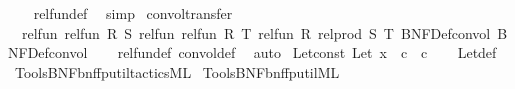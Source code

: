 \begin{isabellebody}
%
\isadelimproof
\ \ %
\endisadelimproof
%
\isatagproof
{}\isamarkupfalse%
\ rel{\isacharunderscore}{\kern0pt}fun{\isacharunderscore}{\kern0pt}def\ \isamarkupfalse%
\ simp%
\endisatagproof
{\isafoldproof}%
%
\isadelimproof
\isanewline
%
\endisadelimproof
\isanewline
{}\isamarkupfalse%
\ convol{\isacharunderscore}{\kern0pt}transfer{\isacharcolon}{\kern0pt}\isanewline
\ \ {\isachardoublequoteopen}rel{\isacharunderscore}{\kern0pt}fun\ {\isacharparenleft}{\kern0pt}rel{\isacharunderscore}{\kern0pt}fun\ R\ S{\isacharparenright}{\kern0pt}\ {\isacharparenleft}{\kern0pt}rel{\isacharunderscore}{\kern0pt}fun\ {\isacharparenleft}{\kern0pt}rel{\isacharunderscore}{\kern0pt}fun\ R\ T{\isacharparenright}{\kern0pt}\ {\isacharparenleft}{\kern0pt}rel{\isacharunderscore}{\kern0pt}fun\ R\ {\isacharparenleft}{\kern0pt}rel{\isacharunderscore}{\kern0pt}prod\ S\ T{\isacharparenright}{\kern0pt}{\isacharparenright}{\kern0pt}{\isacharparenright}{\kern0pt}\ BNF{\isacharunderscore}{\kern0pt}Def{\isachardot}{\kern0pt}convol\ BNF{\isacharunderscore}{\kern0pt}Def{\isachardot}{\kern0pt}convol{\isachardoublequoteclose}\isanewline
%
\isadelimproof
\ \ %
\endisadelimproof
%
\isatagproof
{}\isamarkupfalse%
\ rel{\isacharunderscore}{\kern0pt}fun{\isacharunderscore}{\kern0pt}def\ convol{\isacharunderscore}{\kern0pt}def\ \isamarkupfalse%
\ auto%
\endisatagproof
{\isafoldproof}%
%
\isadelimproof
\isanewline
%
\endisadelimproof
\isanewline
{}\isamarkupfalse%
\ Let{\isacharunderscore}{\kern0pt}const{\isacharcolon}{\kern0pt}\ {\isachardoublequoteopen}Let\ x\ {\isacharparenleft}{\kern0pt}{\isasymlambda}{\isacharunderscore}{\kern0pt}{\isachardot}{\kern0pt}\ c{\isacharparenright}{\kern0pt}\ {\isacharequal}{\kern0pt}\ c{\isachardoublequoteclose}\isanewline
%
\isadelimproof
\ \ %
\endisadelimproof
%
\isatagproof
{}\isamarkupfalse%
\ Let{\isacharunderscore}{\kern0pt}def\ \isacommand{{\isachardot}{\kern0pt}{\isachardot}{\kern0pt}}\isamarkupfalse%
%
\endisatagproof
{\isafoldproof}%
%
\isadelimproof
\isanewline
%
\endisadelimproof
%
\isadelimML
\isanewline
%
\endisadelimML
%
\isatagML
{}\isamarkupfalse%
\ {\isacartoucheopen}Tools{\isacharslash}{\kern0pt}BNF{\isacharslash}{\kern0pt}bnf{\isacharunderscore}{\kern0pt}fp{\isacharunderscore}{\kern0pt}util{\isacharunderscore}{\kern0pt}tactics{\isachardot}{\kern0pt}ML{\isacartoucheclose}\isanewline
{}\isamarkupfalse%
\ {\isacartoucheopen}Tools{\isacharslash}{\kern0pt}BNF{\isacharslash}{\kern0pt}bnf{\isacharunderscore}{\kern0pt}fp{\isacharunderscore}{\kern0pt}util{\isachardot}{\kern0pt}ML{\isacartoucheclose}\isanewline

\end{isabellebody}

